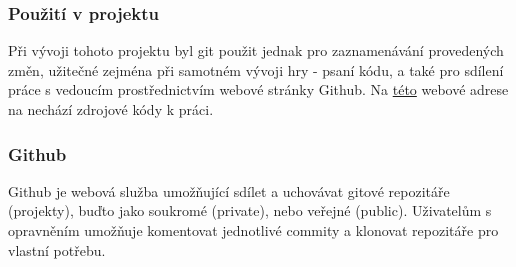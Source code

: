 \documentclass[main.tex]{subfiles}
\begin{document}
\subsubsection{Použití v projektu}
Při vývoji tohoto projektu byl git použit jednak pro zaznamenávání provedených změn, užitečné zejména při samotném vývoji hry - psaní kódu, a také pro sdílení práce s vedoucím prostřednictvím webové stránky Github. Na \href{https://github.com/vojta006/mp}{této} webové adrese na nechází zdrojové kódy k práci.

\subsubsection{Github}
Github je webová služba umožňující sdílet a uchovávat gitové repozitáře (projekty), buďto jako soukromé (private), nebo veřejné (public). Uživatelům s opravněním umožňuje komentovat jednotlivé commity a klonovat repozitáře pro vlastní potřebu. 
\end{document}
